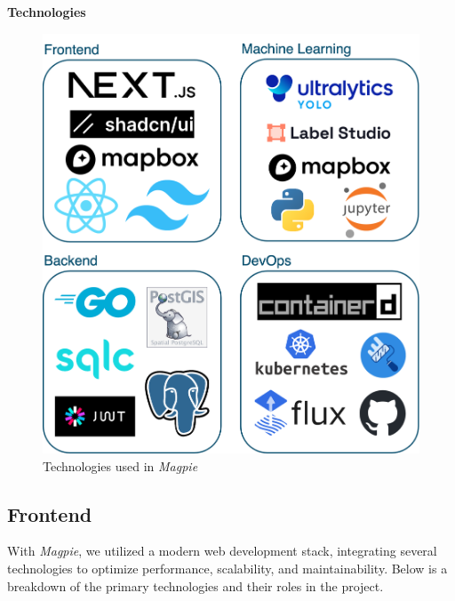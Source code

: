 \textbf{Technologies}

\begin{figure}[h]
  \centering
  \includegraphics[width=0.8\columnwidth]{images/stack_grid.png}
  \caption{Technologies used in \textit{Magpie}}
  \label{fig:tech_stack}
\end{figure}

\subsection{Frontend}
With \textit{Magpie}, we utilized a modern web development stack, integrating
several technologies to optimize performance, scalability, and maintainability.
Below is a breakdown of the primary technologies and their roles in the project.

